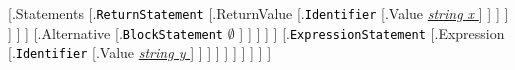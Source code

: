 \documentclass[border=0.2cm]{standalone}
\begin{document}
                                            [.{\small Statements}
                                                [.\colorbox{yellish}{\textcolor{black}{\tt ReturnStatement}}
                                                    [.{\small ReturnValue}
                                                        [.\colorbox{bluish}{\textcolor{black}{\tt Identifier}}
                                                            [.{\small Value}
                                                            \underline{\it string x }
                                                            ]
                                                        ]
                                                    ]
                                                ]
                                            ]
                                        ]
                                    ]
                                    [.{\small Alternative}
                                        [.\colorbox{yellish}{\textcolor{black}{\tt BlockStatement}} $\emptyset$
                                        ]
                                    ]
                                ]
                            ]
                        ]
                        [.\colorbox{yellish}{\textcolor{black}{\tt ExpressionStatement}}
                            [.{\small Expression}
                                [.\colorbox{bluish}{\textcolor{black}{\tt Identifier}}
                                    [.{\small Value}
                                    \underline{\it string y }
                                    ]
                                ]
                            ]
                        ]
                    ]
                ]
            ]
        ]
    ]
]
\end{document}
